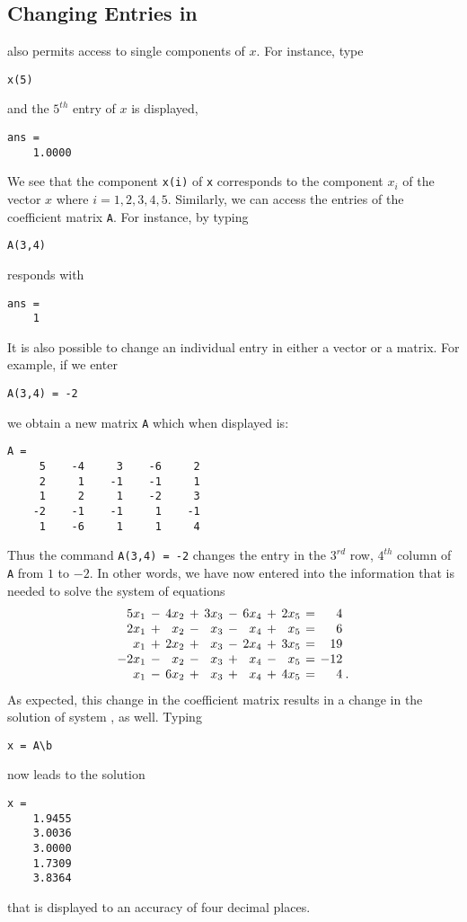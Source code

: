 \subsection*{Changing Entries in \Matlab}

\Matlab also permits access to single components of $x$.  For
instance, type
\begin{verbatim}
x(5)
\end{verbatim}
and the $5^{th}$ entry of $x$ is displayed,
\begin{verbatim}
ans =
    1.0000
\end{verbatim}
We see that the component {\tt x(i)} of {\tt x} corresponds to
the component $x_i$ of the vector $x$ where $i=1,2,3,4,5$.
Similarly, we can access the entries of the coefficient matrix
 {\tt A}.
For instance, by typing
\begin{verbatim}
A(3,4)
\end{verbatim}
\Matlab responds with
\begin{verbatim}
ans =
    1
\end{verbatim}

It is also possible to change an individual entry in either a vector
or a matrix.  For example, if we enter
\begin{verbatim}
A(3,4) = -2
\end{verbatim}  
we obtain a new matrix {\tt A} which when displayed is:
\begin{verbatim}
A =
     5    -4     3    -6     2
     2     1    -1    -1     1
     1     2     1    -2     3
    -2    -1    -1     1    -1
     1    -6     1     1     4
\end{verbatim}
Thus the command {\tt A(3,4) = -2} changes the entry in the
$3^{rd}$ row, $4^{th}$ column of {\tt A} from $1$ to $-2$.
In other words, we have now entered into \Matlab the
information that is needed to solve the system of equations
\[
\arraycolsep 2pt
\begin{array}{rcrcrcrcrcrl}
 5x_1 & - & 4x_2 & + & 3x_3 & - &  6x_4 & + & 2x_5 & = &   4  & \\
 2x_1 & + &  x_2 & - &  x_3 & - &   x_4 & + &  x_5 & = &   6  & \\
  x_1 & + & 2x_2 & + &  x_3 & - &  2x_4 & + & 3x_5 & = &  19  & \\
-2x_1 & - &  x_2 & - &  x_3 & + &   x_4 & - &  x_5 & = & -12  & \\
x_1 & - & 6x_2 & + & x_3 & + & x_4 & + & 4x_5 & = & 4 & \! .
\end{array}
\]
As expected, this change in the coefficient matrix results in a
change in the solution of system , as well.  Typing
\begin{verbatim}
x = A\b
\end{verbatim}
now leads to the solution
\begin{verbatim}
x =
    1.9455
    3.0036
    3.0000
    1.7309
    3.8364
\end{verbatim}
that is displayed to an accuracy of four decimal places.

